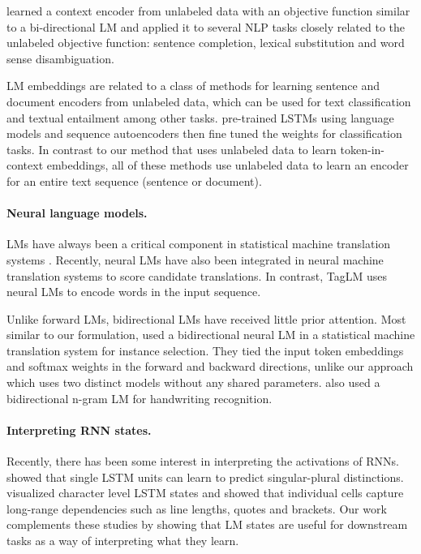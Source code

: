 \documentclass[11pt,a4paper]{article}
\begin{document}
\citet{Melamud2016context2vecLG} learned a context encoder from unlabeled data with an objective function similar to a bi-directional LM and applied
it to several NLP tasks closely related to the unlabeled objective function: sentence completion, lexical substitution and word sense disambiguation.



LM embeddings are related to a class of methods \citep[e.g.,][]{Le2014DistributedRO,Kiros2015SkipThoughtV,Hill2016LearningDR} for learning sentence and document encoders from unlabeled data, which can be used for text classification and textual entailment among other tasks.  \citet{Dai2015SemisupervisedSL} pre-trained LSTMs using language models and sequence autoencoders then fine tuned the weights for classification tasks.  In contrast to our method that uses unlabeled data to learn token-in-context embeddings, all of these methods use unlabeled data to learn an encoder for an entire text sequence (sentence or document).

\paragraph{Neural language models.}
LMs have always been a critical component in statistical machine translation systems \citep{koehn:09}.
Recently, neural LMs \citep{bengio:03,mikolov:10} have also been integrated in neural machine translation systems \citep[e.g.,][]{kalchbrenner:13,devlin:14} to score candidate translations.
In contrast, TagLM uses neural LMs to encode words in the input sequence.

Unlike forward LMs, bidirectional LMs have received little prior attention.
Most similar to our formulation, \citet{Peris2015ABR} used a bidirectional
neural LM in a statistical machine translation system for instance selection.
They tied the input token embeddings and softmax weights in
the forward and backward directions, unlike our approach which uses
two distinct models without any shared parameters.
\citet{frinken:12} also used a bidirectional n-gram LM for
handwriting recognition.



\paragraph{Interpreting RNN states.}
Recently, there has been some interest in interpreting the activations of RNNs. \citet{Linzen2016AssessingTA} showed that single LSTM units
can learn to predict singular-plural distinctions.  \citet{Karpathy2015VisualizingAU} visualized character level LSTM states and showed that individual cells capture long-range dependencies such as line lengths, quotes and brackets.  Our work complements these studies by showing that LM states are useful for downstream tasks as a way of interpreting what they learn.
\end{document}
